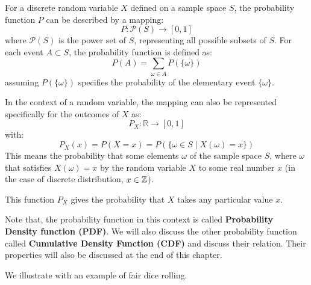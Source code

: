 \begin{definition}
    For a discrete random variable \( X \) defined on a sample space \( S \), the probability function \( P \) can be described by a mapping:
    \[
    P: \mathcal{P}(S) \to [0, 1]
    \]
    where \( \mathcal{P}(S) \) is the power set of \( S \), representing all possible subsets of \( S \). For each event \( A \subset S \), the probability function is defined as:
    \[
    P(A) = \sum_{\omega \in A} P(\{\omega\})
    \]
    assuming \( P(\{\omega\}) \) specifies the probability of the elementary event \( \{\omega\} \).
    
    In the context of a random variable, the mapping can also be represented specifically for the outcomes of \( X \) as:
    \[
    P_X: \mathbb{R} \to [0, 1]
    \]
    with:
    \[
    P_X(x) = P(X = x) = P(\{\omega \in S \mid X(\omega) = x\})
    \]
    This means the probability that some elements $\omega$ of the sample space $S$, where $\omega$ that satisfies $X(\omega)=x$ by the random variable $X$ to some real number $x$ (in the case of discrete distribution, $x\in \mathbb{Z}$).
    
    This function \( P_X \) gives the probability that \( X \) takes any particular value \( x \).    
\end{definition}
\begin{remark}
    Note that, the probability function in this context is called \textbf{Probability Density function (PDF)}. We will also discuss the other probability function called \textbf{Cumulative Density Function (CDF)} and discuss their relation. Their properties will also be discussed at the end of this chapter.
\end{remark}
We illustrate with an example of fair dice rolling.
